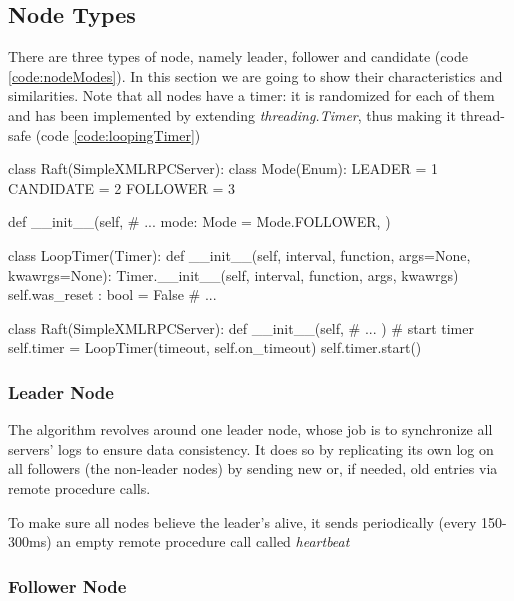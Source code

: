 \subsection{Node Types} \label{sec:nodes}

There are three types of node, namely leader, follower and candidate (code \ref{code:nodeModes}). In this section we are going to show their characteristics and similarities. Note that all nodes have a timer: it is randomized for each of them and has been implemented by extending \textit{threading.Timer}, thus making it thread-safe (code \ref{code:loopingTimer})

\begin{python}[label={code:nodeModes}, caption={Node modes}]
class Raft(SimpleXMLRPCServer):
    class Mode(Enum):
        LEADER = 1
        CANDIDATE = 2
        FOLLOWER = 3
                
    def __init__(self, 
                 # ...
                 mode: Mode = Mode.FOLLOWER,
                 )
\end{python}

\begin{python}[label={code:loopingTimer}, caption={Threadsafe looping timer}]
class LoopTimer(Timer):
    def __init__(self, interval, function, args=None, kwawrgs=None):
        Timer.__init__(self, interval, function, args, kwawrgs)
        self.was_reset : bool = False
    # ...

class Raft(SimpleXMLRPCServer):
    def __init__(self, 
                 # ...
                 )
        # start timer
        self.timer = LoopTimer(timeout, self.on_timeout)
        self.timer.start()
\end{python}

\subsubsection{Leader Node}

The algorithm revolves around one leader node, whose job is to synchronize all servers' logs to ensure data consistency. It does so by replicating its own log on all followers (the non-leader nodes) by sending new or, if needed, old entries via remote procedure calls. 

To make sure all nodes believe the leader's alive, it sends periodically (every 150-300ms) an empty remote procedure call called \textit{heartbeat}

\subsubsection{Follower Node}

